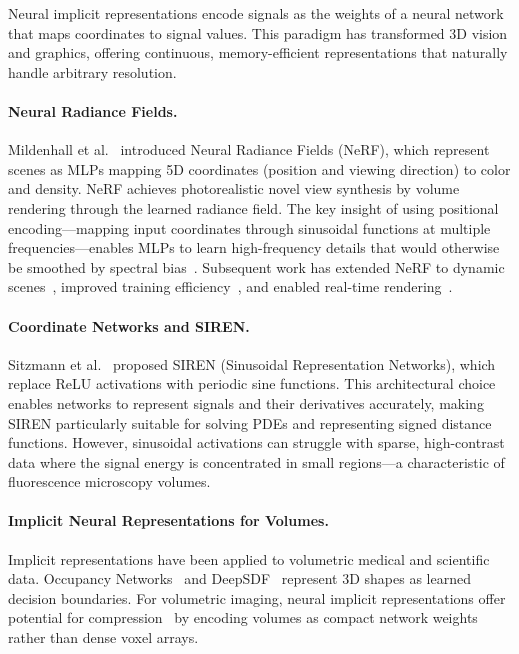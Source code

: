 \documentclass[11pt,a4paper]{article}
\begin{document}
Neural implicit representations encode signals as the weights of a neural network that maps coordinates to signal values. This paradigm has transformed 3D vision and graphics, offering continuous, memory-efficient representations that naturally handle arbitrary resolution.

\paragraph{Neural Radiance Fields.}
Mildenhall et al.~\cite{mildenhall2020nerf} introduced Neural Radiance Fields (NeRF), which represent scenes as MLPs mapping 5D coordinates (position and viewing direction) to color and density. NeRF achieves photorealistic novel view synthesis by volume rendering through the learned radiance field. The key insight of using positional encoding---mapping input coordinates through sinusoidal functions at multiple frequencies---enables MLPs to learn high-frequency details that would otherwise be smoothed by spectral bias~\cite{rahaman2019spectral}. Subsequent work has extended NeRF to dynamic scenes~\cite{pumarola2021dnerf}, improved training efficiency~\cite{mueller2022instant,chen2022tensorf}, and enabled real-time rendering~\cite{yu2021plenoctrees}.

\paragraph{Coordinate Networks and SIREN.}
Sitzmann et al.~\cite{sitzmann2020siren} proposed SIREN (Sinusoidal Representation Networks), which replace ReLU activations with periodic sine functions. This architectural choice enables networks to represent signals and their derivatives accurately, making SIREN particularly suitable for solving PDEs and representing signed distance functions. However, sinusoidal activations can struggle with sparse, high-contrast data where the signal energy is concentrated in small regions---a characteristic of fluorescence microscopy volumes.

\paragraph{Implicit Neural Representations for Volumes.}
Implicit representations have been applied to volumetric medical and scientific data. Occupancy Networks~\cite{mescheder2019occupancy} and DeepSDF~\cite{park2019deepsdf} represent 3D shapes as learned decision boundaries. For volumetric imaging, neural implicit representations offer potential for compression~\cite{dupont2021coin,strumpler2022implicit} by encoding volumes as compact network weights rather than dense voxel arrays.
\end{document}
